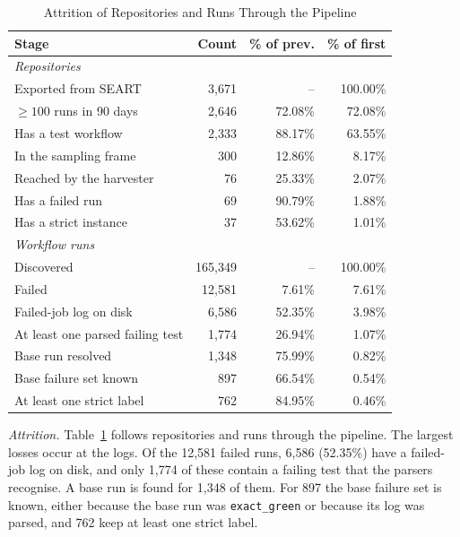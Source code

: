 \documentclass[10pt,conference]{IEEEtran}
\begin{document}
\begin{table}[t]
\caption{Attrition of Repositories and Runs Through the Pipeline}
\label{tab:funnel}
\centering
\scriptsize
\setlength{\tabcolsep}{3pt}
\renewcommand{\arraystretch}{0.90}
\begin{tabular}{@{}lrrr@{}}
\toprule
\textbf{Stage} & \textbf{Count} & \textbf{\% of prev.} & \textbf{\% of first} \\
\midrule
\multicolumn{4}{l}{\textit{Repositories}} \\
Exported from SEART & 3,671 & -- & 100.00\% \\
$\ge 100$ runs in 90 days & 2,646 & 72.08\% & 72.08\% \\
Has a test workflow & 2,333 & 88.17\% & 63.55\% \\
In the sampling frame & 300 & 12.86\% & 8.17\% \\
Reached by the harvester & 76 & 25.33\% & 2.07\% \\
Has a failed run & 69 & 90.79\% & 1.88\% \\
Has a strict instance & 37 & 53.62\% & 1.01\% \\
\midrule
\multicolumn{4}{l}{\textit{Workflow runs}} \\
Discovered & 165,349 & -- & 100.00\% \\
Failed & 12,581 & 7.61\% & 7.61\% \\
Failed-job log on disk & 6,586 & 52.35\% & 3.98\% \\
At least one parsed failing test & 1,774 & 26.94\% & 1.07\% \\
Base run resolved & 1,348 & 75.99\% & 0.82\% \\
Base failure set known & 897 & 66.54\% & 0.54\% \\
At least one strict label & 762 & 84.95\% & 0.46\% \\
\bottomrule
\end{tabular}
\end{table}

\textit{Attrition.} Table~\ref{tab:funnel} follows repositories and runs through the pipeline. The largest losses occur at the logs. Of the 12,581 failed runs, 6,586 (52.35\%) have a failed-job log on disk, and only 1,774 of these contain a failing test that the parsers recognise. A base run is found for 1,348 of them. For 897 the base failure set is known, either because the base run was \texttt{exact\_green} or because its log was parsed, and 762 keep at least one strict label.
\end{document}
